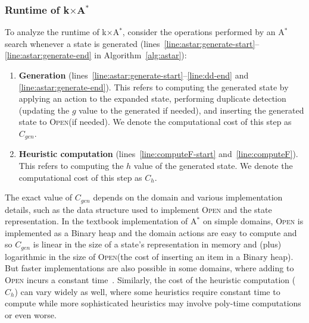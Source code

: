 \documentclass[twoside,11pt]{article}
\newcommand{\astar}{A$^*$\xspace}
\newcommand{\kxastar}{k$\times$A$^*$\xspace}
\newcommand{\open}{\textsc{Open}\xspace}
\begin{document}
\subsubsection{Runtime of \kxastar}
To analyze the runtime of \kxastar, consider the operations performed by an \astar search whenever a state is generated (lines~\ref{line:astar:generate-start}--\ref{line:astar:generate-end} in Algorithm~\ref{alg:astar}):

\begin{enumerate}
  \item \textbf{Generation}  (lines~\ref{line:astar:generate-start}--\ref{line:dd-end} and \ref{line:astar:generate-end}).
  This refers to computing the generated state by applying an action to the expanded state, performing duplicate detection (updating the $g$ value to the generated if needed), and inserting the generated state to \open (if needed).
  We denote the computational cost of this step as $C_{gen}$.

  \item \textbf{Heuristic computation}  (lines~\ref{line:computeF-start} and~\ref{line:computeF}).
  This refers to computing the $h$ value of the generated state.
  We denote the computational cost of this step as $C_{h}$.
\end{enumerate}

The exact value of $C_{gen}$ depends on the domain and various implementation details, such as the data structure used to implement \open and the state representation.
In the textbook implementation of \astar on simple domains, \open is implemented as a Binary heap and the domain actions are easy to compute and so $C_{gen}$ is linear in the size of a state's representation in memory and (plus) logarithmic in the size of \open (the cost of inserting an item in a Binary heap).
But faster implementations are also possible in some domains, where adding to \open incurs a constant time~\cite{GILON2016,BurnsHLR12}.
Similarly, the cost of the heuristic computation ($C_h$) can vary widely as well, where some heuristics require constant time to compute while more sophisticated heuristics may involve poly-time computations or even worse.


\end{document}
